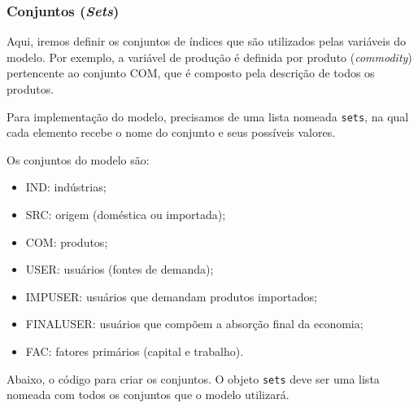 \documentclass[12pt,twoside]{article}
\providecommand{\tightlist}{%
  \setlength{\itemsep}{0pt}\setlength{\parskip}{0pt}}
\begin{document}
\hypertarget{conjuntos-sets}{%
\subsubsection{\texorpdfstring{Conjuntos
(\emph{Sets})}{Conjuntos (Sets)}}\label{conjuntos-sets}}

Aqui, iremos definir os conjuntos de índices que são utilizados pelas
variáveis do modelo. Por exemplo, a variável de produção é definida por
produto (\emph{commodity}) pertencente ao conjunto COM, que é composto
pela descrição de todos os produtos.

Para implementação do modelo, precisamos de uma lista nomeada
\texttt{sets}, na qual cada elemento recebe o nome do conjunto e seus
possíveis valores.

Os conjuntos do modelo são:

\begin{itemize}
\tightlist
\item
  IND: indústrias;
\item
  SRC: origem (doméstica ou importada);
\item
  COM: produtos;
\item
  USER: usuários (fontes de demanda);
\item
  IMPUSER: usuários que demandam produtos importados;
\item
  FINALUSER: usuários que compõem a absorção final da economia;
\item
  FAC: fatores primários (capital e trabalho).
\end{itemize}

Abaixo, o código para criar os conjuntos. O objeto \texttt{sets} deve
ser uma lista nomeada com todos os conjuntos que o modelo utilizará.
\end{document}
